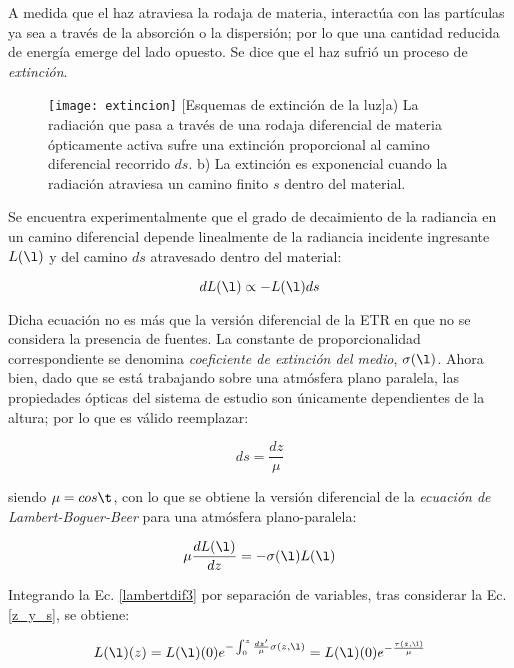 A medida que el haz atraviesa la rodaja de materia, interactúa con las partículas ya sea a través de la absorción o la dispersión; por lo que una cantidad reducida de energía emerge del lado opuesto. Se dice que el haz sufrió un proceso de \textit{extinción}.

\begin{figure}[H]
\centering
\texttt{[image: extincion]}
 [Esquemas de extinción de la luz]{a) La radiación que pasa a través de una rodaja diferencial de materia ópticamente
activa sufre una extinción proporcional al camino diferencial recorrido $ds$.
b) La extinción es exponencial cuando la radiación atraviesa un camino finito $s$ dentro del material.} 
\label{fig:extincion}
\end{figure}

Se encuentra experimentalmente que el grado de decaimiento de la radiancia en un camino diferencial depende linealmente de la radiancia incidente ingresante $L(\l)$ y del camino $ds$ atravesado dentro del material:

\begin{equation}
dL(\l)\propto -L(\l) ds
\label{laambertdif2}
\end{equation}

Dicha ecuación no es más que la versión diferencial de la ETR en que no se considera la presencia de fuentes. La constante de proporcionalidad correspondiente se denomina \textit{coeficiente de extinción del medio}, $\sigma(\l)$. Ahora bien, dado que se está trabajando sobre una atmósfera plano paralela, las propiedades ópticas del sistema de estudio son únicamente dependientes de la altura; por lo que es válido reemplazar:

\begin{equation}
ds=\frac{dz}{\mu}
\label{z_y_s}
\end{equation}

siendo $\mu=cos \t$, con lo que se obtiene la versión diferencial de la \textit{ecuación de Lambert-Boguer-Beer} para una atmósfera plano-paralela:

\begin{equation}
\mu \frac{d L(\l)}{dz}=-\sigma(\l) L(\l)
\label{lambertdif3}
\end{equation}

Integrando la Ec. \eqref{lambertdif3} por separación de variables, tras considerar la Ec. \eqref{z_y_s}, se obtiene:

\begin{equation}
L(\l)(z)=L(\l)(0)e^{-\int_{0}^{z}\frac{dz'}{\mu} \sigma(z,\l)}=L(\l)(0)e^{-\frac{\tau(z,\l)}{\mu}}
\label{lambertint}
\end{equation}

